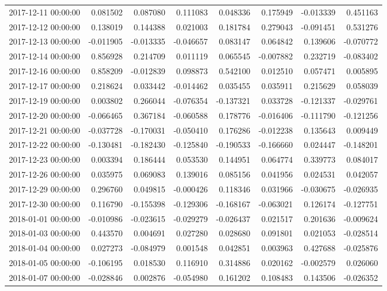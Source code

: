 \begin{tabular}{lrrrrrrr}
2017-12-11 00:00:00 & 0.081502 & 0.087080 & 0.111083 & 0.048336 & 0.175949 & -0.013339 & 0.451163 \\
2017-12-12 00:00:00 & 0.138019 & 0.144388 & 0.021003 & 0.181784 & 0.279043 & -0.091451 & 0.531276 \\
2017-12-13 00:00:00 & -0.011905 & -0.013335 & -0.046657 & 0.083147 & 0.064842 & 0.139606 & -0.070772 \\
2017-12-14 00:00:00 & 0.856928 & 0.214709 & 0.011119 & 0.065545 & -0.007882 & 0.232719 & -0.083402 \\
2017-12-16 00:00:00 & 0.858209 & -0.012839 & 0.098873 & 0.542100 & 0.012510 & 0.057471 & 0.005895 \\
2017-12-17 00:00:00 & 0.218624 & 0.033442 & -0.014462 & 0.035455 & 0.035911 & 0.215629 & 0.058039 \\
2017-12-19 00:00:00 & 0.003802 & 0.266044 & -0.076354 & -0.137321 & 0.033728 & -0.121337 & -0.029761 \\
2017-12-20 00:00:00 & -0.066465 & 0.367184 & -0.060588 & 0.178776 & -0.016406 & -0.111790 & -0.121256 \\
2017-12-21 00:00:00 & -0.037728 & -0.170031 & -0.050410 & 0.176286 & -0.012238 & 0.135643 & 0.009449 \\
2017-12-22 00:00:00 & -0.130481 & -0.182430 & -0.125840 & -0.190533 & -0.166660 & 0.024447 & -0.148201 \\
2017-12-23 00:00:00 & 0.003394 & 0.186444 & 0.053530 & 0.144951 & 0.064774 & 0.339773 & 0.084017 \\
2017-12-26 00:00:00 & 0.035975 & 0.069083 & 0.139016 & 0.085156 & 0.041956 & 0.024531 & 0.042057 \\
2017-12-29 00:00:00 & 0.296760 & 0.049815 & -0.000426 & 0.118346 & 0.031966 & -0.030675 & -0.026935 \\
2017-12-30 00:00:00 & 0.116790 & -0.155398 & -0.129306 & -0.168167 & -0.063021 & 0.126174 & -0.127751 \\
2018-01-01 00:00:00 & -0.010986 & -0.023615 & -0.029279 & -0.026437 & 0.021517 & 0.201636 & -0.009624 \\
2018-01-03 00:00:00 & 0.443570 & 0.004691 & 0.027280 & 0.028680 & 0.091801 & 0.021053 & -0.028514 \\
2018-01-04 00:00:00 & 0.027273 & -0.084979 & 0.001548 & 0.042851 & 0.003963 & 0.427688 & -0.025876 \\
2018-01-05 00:00:00 & -0.106195 & 0.018530 & 0.116910 & 0.314886 & 0.020162 & -0.002579 & 0.026060 \\
2018-01-07 00:00:00 & -0.028846 & 0.002876 & -0.054980 & 0.161202 & 0.108483 & 0.143506 & -0.026352 \\

\end{tabular}

